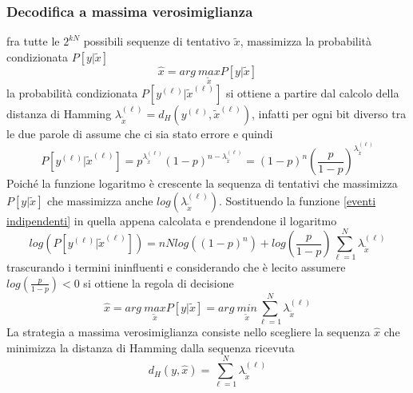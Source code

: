         \subsubsection{Decodifica a massima verosimiglianza}
            fra tutte le $2^{kN}$ possibili sequenze di tentativo $\tilde{x}$, massimizza la probabilità 
            condizionata $P[y|\tilde{x}]$
            \[
                \hat{x} = arg\ \underset{\tilde{x}}{max}P[y|\tilde{x}]   
            \]
            la probabilità condizionata $P\left[y^{(\ell)}|\tilde{x}^{(\ell)}\right]$ si ottiene a partire dal calcolo della distanza di Hamming 
            $\lambda^{(\ell)}_{\tilde{x}} = d_H(y^{(\ell)},\tilde{x}^{(\ell)})$, infatti per ogni bit diverso tra le due parole di assume che ci sia stato errore e quindi 
            \[
                P\left[y^{(\ell)}|\tilde{x}^{(\ell)}\right] = p^{\lambda^{(\ell)}_{\tilde{x}}}(1-p)^{n-\lambda^{(\ell)}_{\tilde{x}}} = (1-p)^n\left(\frac{p}{1-p}\right)^{\lambda^{(\ell)}_{\tilde{x}}}
            \]
            Poiché la funzione logaritmo è crescente la sequenza di tentativi che massimizza $P[y|\tilde{x}]$ che massimizza anche $log\left(\lambda^{(\ell)}_{\tilde{x}}\right)$.
            Sostituendo la funzione \ref{eventi indipendenti} in quella appena calcolata e prendendone il logaritmo
            \[
                log\left(P\left[y^{(\ell)}|\tilde{x}^{(\ell)}\right]\right) =nNlog \left((1-p)^n\right) + log\left(\frac{p}{1-p}\right)\sum_{\ell=1}^{N}\lambda^{(\ell)}_{\tilde{x}}
            \]
            trascurando i termini ininfluenti e considerando che è lecito assumere $log\left(\frac{p}{1-p}\right)<0$ si ottiene la regola di decisione 
            \[
                \hat{x} = arg\ \underset{\tilde{x}}{max}P[y|\tilde{x}] = arg\ \underset{\tilde{x}}{min}\sum_{\ell=1}^{N}\lambda^{(\ell)}_{\tilde{x}}
            \]
            La strategia a massima verosimiglianza consiste nello scegliere la sequenza $\hat{x}$ che minimizza la distanza di Hamming dalla sequenza 
            ricevuta 
            \[
                d_H(y,\hat{x}) = \sum_{\ell=1}^{N}\lambda^{(\ell)}_{\tilde{x}}
            \]
